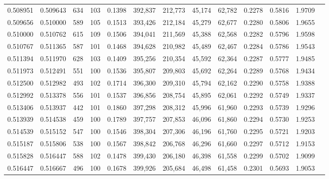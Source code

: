 \begin{tabular}{rrrrrrrrrrrrr}
0.508951 & 0.509643 &    634 &   103 &                                     0.1398 & 392,837 & 212,773 &  45,174 &  62,782 & 0.2278 & 0.5816 & 1.9709 \\
0.509656 & 0.510000 &    589 &   105 &                                     0.1513 & 393,426 & 212,184 &  45,279 &  62,677 & 0.2280 & 0.5806 & 1.9655 \\
0.510000 & 0.510762 &    615 &   109 &                                     0.1506 & 394,041 & 211,569 &  45,388 &  62,568 & 0.2282 & 0.5796 & 1.9598 \\
0.510767 & 0.511365 &    587 &   101 &                                     0.1468 & 394,628 & 210,982 &  45,489 &  62,467 & 0.2284 & 0.5786 & 1.9543 \\
0.511394 & 0.511970 &    628 &   103 &                                     0.1409 & 395,256 & 210,354 &  45,592 &  62,364 & 0.2287 & 0.5777 & 1.9485 \\
0.511973 & 0.512491 &    551 &   100 &                                     0.1536 & 395,807 & 209,803 &  45,692 &  62,264 & 0.2289 & 0.5768 & 1.9434 \\
0.512500 & 0.512982 &    493 &   102 &                                     0.1714 & 396,300 & 209,310 &  45,794 &  62,162 & 0.2290 & 0.5758 & 1.9388 \\
0.512992 & 0.513378 &    556 &   101 &                                     0.1537 & 396,856 & 208,754 &  45,895 &  62,061 & 0.2292 & 0.5749 & 1.9337 \\
0.513406 & 0.513937 &    442 &   101 &                                     0.1860 & 397,298 & 208,312 &  45,996 &  61,960 & 0.2293 & 0.5739 & 1.9296 \\
0.513939 & 0.514538 &    459 &   100 &                                     0.1789 & 397,757 & 207,853 &  46,096 &  61,860 & 0.2294 & 0.5730 & 1.9253 \\
0.514539 & 0.515152 &    547 &   100 &                                     0.1546 & 398,304 & 207,306 &  46,196 &  61,760 & 0.2295 & 0.5721 & 1.9203 \\
0.515187 & 0.515806 &    538 &   100 &                                     0.1567 & 398,842 & 206,768 &  46,296 &  61,660 & 0.2297 & 0.5712 & 1.9153 \\
0.515828 & 0.516447 &    588 &   102 &                                     0.1478 & 399,430 & 206,180 &  46,398 &  61,558 & 0.2299 & 0.5702 & 1.9099 \\
0.516447 & 0.516667 &    496 &   100 &                                     0.1678 & 399,926 & 205,684 &  46,498 &  61,458 & 0.2301 & 0.5693 & 1.9053 \\

\end{tabular}
